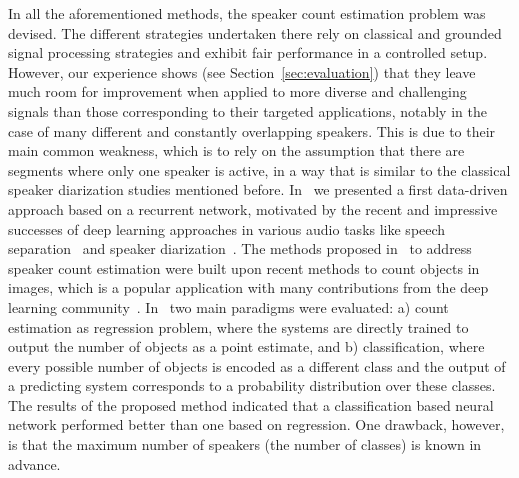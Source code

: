 In all the aforementioned methods, the speaker count estimation problem was devised.
The different strategies undertaken there rely on classical and grounded signal processing strategies and exhibit fair performance in a controlled setup.
However, our experience shows (see Section~\ref{sec:evaluation}) that they leave much room for improvement when applied to more diverse and challenging signals than those corresponding to their targeted applications, notably in the case of many different and constantly overlapping speakers.
This is due to their main common weakness, which is to rely on the assumption that there are segments where only one speaker is active, in a way that is similar to the classical speaker diarization studies mentioned before.
In~\cite{stoeter17} we presented a first data-driven approach based on a recurrent network, motivated by the recent and impressive successes of deep learning approaches in various audio tasks like speech separation~\cite{yu16, hershey16, grais17} and speaker diarization~\cite{yella14, hruz16, garciaromero17}.
The methods proposed in~\cite{stoeter17} to address speaker count estimation were built upon recent methods to count objects in images, which is a popular application with many contributions from the deep learning community~\cite{wang15, chattopadhyay17, khan16, segui15, zhang15, arteta16, marsden16, boominathan16, zhang2015salient}.
In~\cite{stoeter17} two main paradigms were evaluated: a) count estimation as regression problem, where the systems are directly trained to output the number of objects as a point estimate, and b) classification, where every possible number of objects is encoded as a different class and the output of a predicting system corresponds to a probability distribution over these classes.
The results of the proposed method indicated that a classification based neural network performed better than one based on regression.
One drawback, however, is that the maximum number of speakers (the number of classes) is known in advance.


\par

